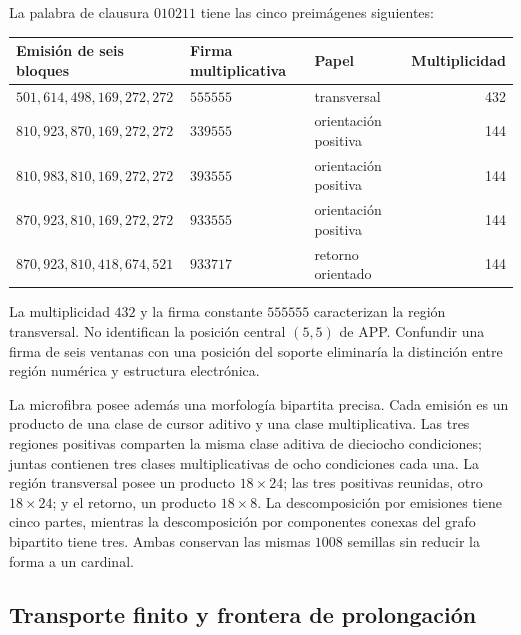 La palabra de clausura \(010211\) tiene las cinco preimágenes siguientes:
\begin{center}\small
\begin{tabular}{@{}lll r@{}}\toprule
Emisión de seis bloques&Firma multiplicativa&Papel&Multiplicidad\\\midrule
\(501,614,498,169,272,272\)&\(555555\)&transversal&432\\
\(810,923,870,169,272,272\)&\(339555\)&orientación positiva&144\\
\(810,983,810,169,272,272\)&\(393555\)&orientación positiva&144\\
\(870,923,810,169,272,272\)&\(933555\)&orientación positiva&144\\
\(870,923,810,418,674,521\)&\(933717\)&retorno orientado&144\\\bottomrule
\end{tabular}
\end{center}
La multiplicidad \(432\) y la firma constante \(555555\) caracterizan la región transversal. No identifican la posición central \((5,5)\) de APP. Confundir una firma de seis ventanas con una posición del soporte eliminaría la distinción entre región numérica y estructura electrónica.

La microfibra posee además una morfología bipartita precisa. Cada emisión es un producto de una clase de cursor aditivo y una clase multiplicativa. Las tres regiones positivas comparten la misma clase aditiva de dieciocho condiciones; juntas contienen tres clases multiplicativas de ocho condiciones cada una. La región transversal posee un producto \(18\times24\); las tres positivas reunidas, otro \(18\times24\); y el retorno, un producto \(18\times8\). La descomposición por emisiones tiene cinco partes, mientras la descomposición por componentes conexas del grafo bipartito tiene tres. Ambas conservan las mismas \(1008\) semillas sin reducir la forma a un cardinal.





\subsection{Transporte finito y frontera de prolongación}

